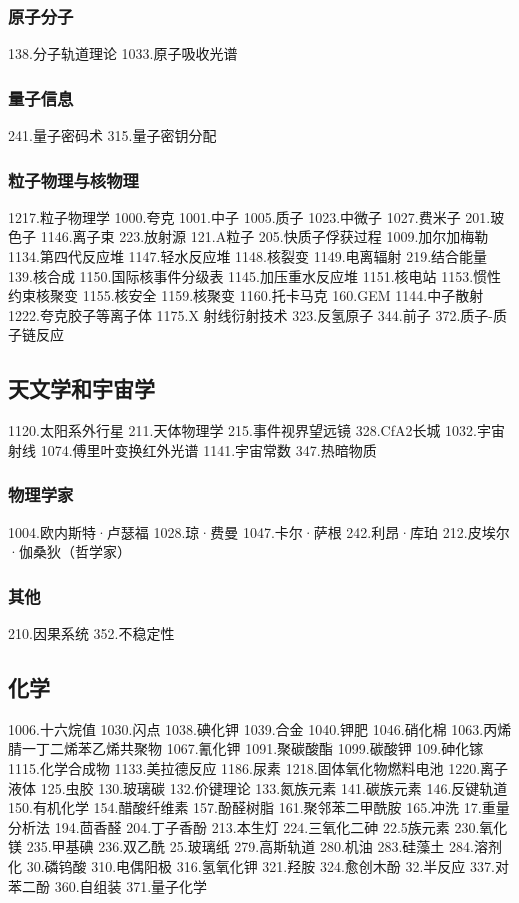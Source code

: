 \subsubsection{原子分子}
138.分子轨道理论
1033.原子吸收光谱
\subsubsection{量子信息}
241.量子密码术
315.量子密钥分配
\subsubsection{粒子物理与核物理}
1217.粒子物理学
1000.夸克
1001.中子
1005.质子
1023.中微子
1027.费米子
201.玻色子
1146.离子束
223.放射源
121.Α粒子
205.快质子俘获过程
1009.加尔加梅勒
1134.第四代反应堆
1147.轻水反应堆
1148.核裂变
1149.电离辐射
219.结合能量
139.核合成
1150.国际核事件分级表
1145.加压重水反应堆
1151.核电站
1153.惯性约束核聚变
1155.核安全
1159.核聚变
1160.托卡马克
160.GEM
1144.中子散射
1222.夸克胶子等离子体
1175.X 射线衍射技术
323.反氢原子
344.前子
372.质子-质子链反应

\subsection{天文学和宇宙学}
1120.太阳系外行星
211.天体物理学
215.事件视界望远镜
328.CfA2长城
1032.宇宙射线
1074.傅里叶变换红外光谱
1141.宇宙常数
347.热暗物质
\subsubsection{物理学家}
1004.欧内斯特·卢瑟福
1028.琼·费曼
1047.卡尔·萨根
242.利昂·库珀
212.皮埃尔·伽桑狄（哲学家）

\subsubsection{其他}
210.因果系统
352.不稳定性

\subsection{化学}
1006.十六烷值
1030.闪点
1038.碘化钾
1039.合金
1040.钾肥
1046.硝化棉
1063.丙烯腈一丁二烯苯乙烯共聚物
1067.氰化钾
1091.聚碳酸酯
1099.碳酸钾
109.砷化镓
1115.化学合成物
1133.美拉德反应
1186.尿素
1218.固体氧化物燃料电池
1220.离子液体
125.虫胶
130.玻璃碳
132.价键理论
133.氮族元素
141.碳族元素
146.反键轨道
150.有机化学
154.醋酸纤维素
157.酚醛树脂
161.聚邻苯二甲酰胺
165.冲洗
17.重量分析法
194.茴香醛
204.丁子香酚
213.本生灯
224.三氧化二砷
22.5族元素
230.氧化镁
235.甲基碘
236.双乙酰
25.玻璃纸
279.高斯轨道
280.机油
283.硅藻土
284.溶剂化
30.磷钨酸
310.电偶阳极
316.氢氧化钾
321.羟胺
324.愈创木酚
32.半反应
337.对苯二酚
360.自组装
371.量子化学

